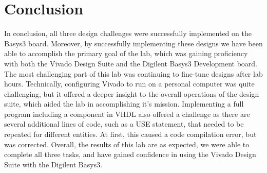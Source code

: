\documentclass[11pt]{article}
\begin{document}
\section{Conclusion}

In conclusion, all three design challenges were successfully implemented on the Basys3 board. Moreover, by successfully implementing these designs we have been able to accomplish the primary goal of the lab, which was gaining proficiency with both the Vivado Design Suite and the Digilent Basys3 Development board. The most challenging part of this lab was continuing to fine-tune designs after lab hours. Technically, configuring Vivado to run on a personal computer was quite challenging, but it offered a deeper insight to the overall operations of the design suite, which aided the lab in accomplishing it's mission. Implementing a full program including a component in VHDL also offered a challenge as there are several additional lines of code, such as a USE statement, that needed to be repeated for different entities. At first, this caused a code compilation error, but was corrected. Overall, the results of this lab are as expected, we were able to complete all three tasks, and have gained confidence in using the Vivado Design Suite with the Digilent Basys3.
\end{document}
